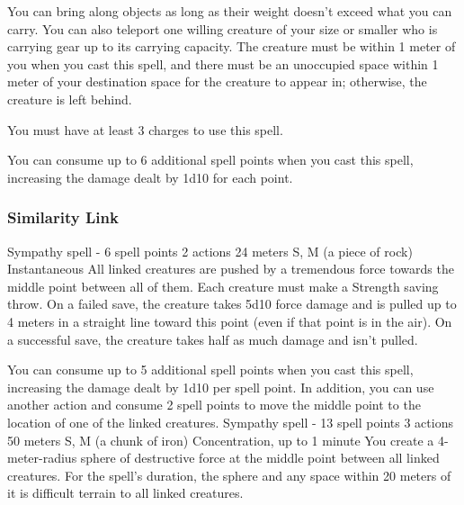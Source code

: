         You can bring along objects as long as their weight doesn't exceed what you can carry.
        You can also teleport one willing creature of your size or smaller who is carrying gear up to its carrying capacity.
        The creature must be within 1 meter of you when you cast this spell, and there must be an unoccupied space within 1 meter of your destination space for the creature to appear in; otherwise, the creature is left behind.

        You must have at least 3 charges to use this spell.

        You can consume up to 6 additional spell points when you cast this spell, increasing the damage dealt by 1d10 for each point.
\subsubsection{Similarity Link}
        {Sympathy spell - 6 spell points}
        {2 actions}
        {24 meters}
        {S, M (a piece of rock)}
        {Instantaneous}
        All linked creatures are pushed by a tremendous force towards the middle point between all of them.
        Each creature must make a Strength saving throw.
        On a failed save, the creature takes 5d10 force damage and is pulled up to 4 meters in a straight line toward this point (even if that point is in the air).
        On a successful save, the creature takes half as much damage and isn't pulled.

        You can consume up to 5 additional spell points when you cast this spell, increasing the damage dealt by 1d10 per spell point.
        In addition, you can use another action and consume 2 spell points to move the middle point to the location of one of the linked creatures.
        {Sympathy spell - 13 spell points}
        {3 actions}
        {50 meters}
        {S, M (a chunk of iron)}
        {Concentration, up to 1 minute}
        You create a 4-meter-radius sphere of destructive force at the middle point between all linked creatures.
        For the spell's duration, the sphere and any space within 20 meters of it is difficult terrain to all linked creatures.


